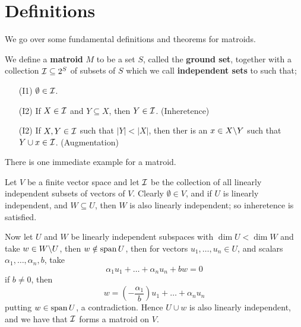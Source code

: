
\section{Definitions}

We go over some fundamental definitions and theorems for matroids.

\begin{definition}
    We define a \textbf{matroid} $M$ to be a set $S$, called the \textbf {ground set}, together with
    a collection $\mathcal{I} \subseteq 2^S$ of subsets of  $S$ which we call \textbf {independent sets} to
    such that;
        \begin{enumerate}
            \item[(I1)] $\emptyset \in \mathcal{I}$.

            \item[(I2)] If $X \in \mathcal{I}$ and $Y \subseteq X$, then  $Y \in \mathcal{I}$. (Inheretence)

            \item[(I2)] If $X,Y \in \mathcal{I}$ such that  $|Y|<|X|$, then ther is an  $x \in X\backslash Y$ such
                that $Y \cup x \in \mathcal{I}$.  (Augmentation)
        \end{enumerate}
\end{definition}

There is one immediate example for a matroid.

\begin{example}
    Let $V$ be a finite vector space and let  $\mathcal{I}$ be the collection of all linearly independent
    subsets of vectors of  $V$. Clearly  $\emptyset \in V$, and if  $U$ is linearly independent, and
     $W \subseteq U$, then  $W$ is also linearly independent; so inheretence is satisfied.

     Now let $U$ and  $W$ be linearly independent subspaces with  $\dim{U}<\dim{W}$ and take $w \in
     W\backslash U$, then $w \notin \operatorname{span}{U}$, then for vectors $ u_1, \dots, u_n \in U$, and
     scalars $\alpha_1, \dots, \alpha_n,b$, take
        \begin{equation*}
            \alpha_1u_1+\dots+\alpha_nu_n+bw=0
        \end{equation*}
    if $b \neq 0$, then
        \begin{equation*}
            w=(-\frac{\alpha_1}{b})u_1+\dots+\alpha_nu_n
        \end{equation*}
    putting $w \in \operatorname{span}{U}$, a contradiction. Hence $U \cup w$ is also linearly independent, and we
    have that $\mathcal{I}$ forms a matroid on $V$.
\end{example} 

